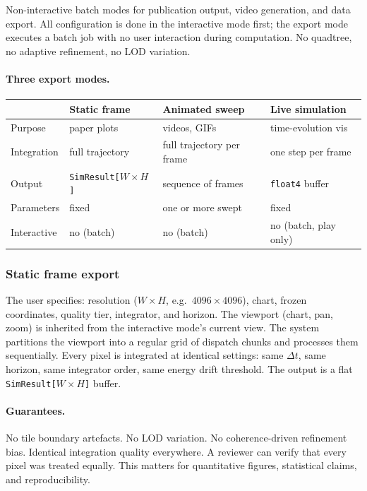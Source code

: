 \documentclass[11pt]{report}
\begin{document}
Non-interactive batch modes for publication output, video generation, and data export. All configuration is done in the interactive mode first; the export mode executes a batch job with no user interaction during computation. No quadtree, no adaptive refinement, no LOD variation.

\paragraph{Three export modes.}

\begin{center}
\begin{tabular}{llll}
\toprule
& Static frame & Animated sweep & Live simulation \\
\midrule
Purpose & paper plots & videos, GIFs & time-evolution vis \\
Integration & full trajectory & full trajectory per frame & one step per frame \\
Output & \texttt{SimResult[$W \times H$]} & sequence of frames & \texttt{float4} buffer \\
Parameters & fixed & one or more swept & fixed \\
Interactive & no (batch) & no (batch) & no (batch, play only) \\
\bottomrule
\end{tabular}
\end{center}


\subsubsection{Static frame export}

The user specifies: resolution ($W\times H$, e.g.\ $4096\times 4096$), chart, frozen coordinates, quality tier, integrator, and horizon. The viewport (chart, pan, zoom) is inherited from the interactive mode's current view. The system partitions the viewport into a regular grid of dispatch chunks and processes them sequentially. Every pixel is integrated at identical settings: same $\Delta t$, same horizon, same integrator order, same energy drift threshold. The output is a flat \texttt{SimResult[$W\times H$]} buffer.

\paragraph{Guarantees.} No tile boundary artefacts. No LOD variation. No coherence-driven refinement bias. Identical integration quality everywhere. A reviewer can verify that every pixel was treated equally. This matters for quantitative figures, statistical claims, and reproducibility.
\end{document}
